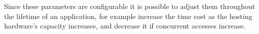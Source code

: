 Since these parameters are configurable it is possible to adjust them throughout the lifetime of an application, for example increase the time cost as the hosting hardware's capacity increases, and decrease it if concurrent accesses increase.




%
%

